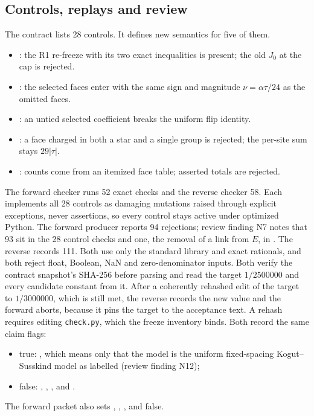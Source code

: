 \subsection{Controls, replays and review}
\label{sec:ax1-evidence}
The contract lists 28 controls. It defines new semantics for five of them.
\begin{itemize}\raggedright
\item {}: the R1 re-freeze with its two exact
inequalities is present; the old $J_0$ at the cap is rejected.
\item {}: the selected faces enter with the
same sign and magnitude $\nu=\alpha\tau/24$ as the omitted faces.
\item {}: an untied selected coefficient
breaks the uniform flip identity.
\item {}: a face charged in both a star and a
single group is rejected; the per-site sum stays $29|\tau|$.
\item {}: counts come from an itemized face
table; asserted totals are rejected.
\end{itemize}
The forward checker runs 52 exact checks and
the reverse checker 58. Each implements all 28 controls as damaging mutations
raised through explicit exceptions, never assertions, so every control stays
active under optimized Python. The forward producer reports 94 rejections;
review finding N7 notes that 93 sit in the 28 control checks and one, the
removal of a link from $E$, in . The reverse
records 111. Both use only the standard library and exact rationals, and both
reject float, Boolean, NaN and zero-denominator inputs. Both verify the
contract snapshot's SHA-256 before parsing and read the target $1/2500000$
and every candidate constant from it. After a coherently rehashed edit of the
target to $1/3000000$, which is still met, the reverse records the new value
and the forward aborts, because it pins the target to the acceptance text. A
rehash requires editing \texttt{check.py}, which the freeze inventory binds.
Both record the same claim flags:
\begin{itemize}\raggedright
\item true: , which means only that the model is
the uniform fixed-spacing Kogut--Susskind model as labelled (review finding
N12);
\item false: , ,
,  and
.
\end{itemize}
The forward packet also sets ,
, ,
 and  false.

